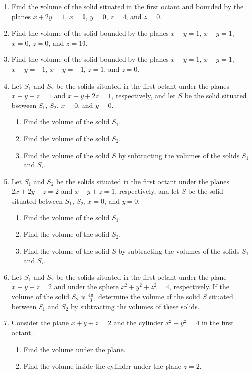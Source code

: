 \documentclass{exercises}
\begin{document}
\begin{enumerate}[resume]
\item Find the volume of the solid situated in the first octant and bounded by the planes $x+2y=1$, $x=0$, $y=0$, $z=4$, and $z=0$.
\item Find the volume of the solid bounded by the planes $x+y=1$, $x-y=1$, $x=0$, $z=0$, and $z=10$.
\item Find the volume of the solid bounded by the planes $x+y=1$, $x-y=1$, $x+y=-1$, $x-y=-1$, $z=1$, and $z=0$.
\item Let $S_{1}$ and $S_{2}$ be the solids situated in the first octant under the planes $x+y+z=1$ and $x+y+2z=1$, respectively, and let $S$ be the solid situated between $S_{1}$, $S_{2}$, $x=0$, and $y=0$.
\begin{enumerate}[label=(\alph*)]
  \item Find the volume of the solid $S_{1}$.
  \item Find the volume of the solid $S_{2}$.
  \item Find the volume of the solid $S$ by subtracting the volumes of the solids $S_{1}$ and $S_{2}$.
\end{enumerate}
\item Let $S_{1}$ and $S_{2}$ be the solids situated in the first octant under the planes $2x+2y+z=2$ and $x+y+z=1$, respectively, and let $S$ be the solid situated between $S_{1}$, $S_{2}$, $x=0$, and $y=0$.
\begin{enumerate}[label=(\alph*)]
  \item Find the volume of the solid $S_{1}$.
  \item Find the volume of the solid $S_{2}$.
  \item Find the volume of the solid $S$ by subtracting the volumes of the solids $S_{1}$ and $S_{2}$.
\end{enumerate}
\item Let $S_{1}$ and $S_{2}$ be the solids situated in the first octant under the plane $x+y+z=2$ and under the sphere $x^{2}+y^{2}+z^{2}=4$, respectively. If the volume of the solid $S_{2}$ is $\frac{4\pi}{3}$, determine the volume of the solid $S$ situated between $S_{1}$ and $S_{2}$ by subtracting the volumes of these solids.
\item Consider the plane $x+y+z=2$ and the cylinder $x^{2}+y^{2}=4$ in the first octant.
\begin{enumerate}[label=(\alph*)]
  \item Find the volume under the plane.
  \item Find the volume inside the cylinder under the plane $z=2$.

\end{enumerate}
\end{enumerate}
\end{document}
